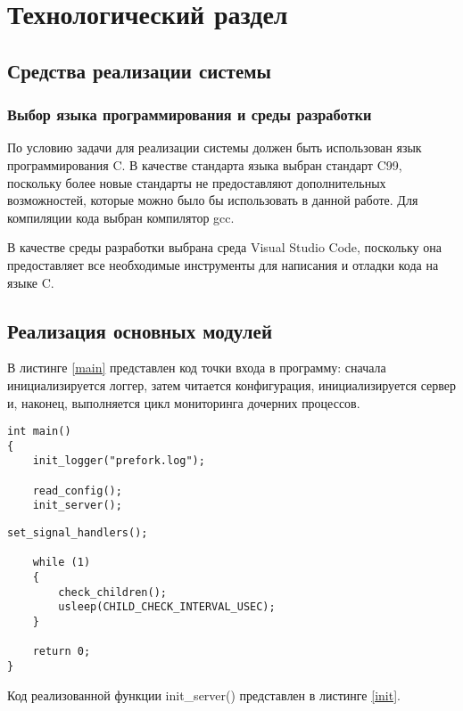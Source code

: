 \section{Технологический раздел}

\subsection{Средства реализации системы}

\subsubsection{Выбор языка программирования и среды разработки}

По условию задачи для реализации системы должен быть использован язык программирования C. В качестве стандарта языка выбран стандарт C99, поскольку более новые стандарты не предоставляют дополнительных возможностей, которые можно было бы использовать в данной работе. Для компиляции кода выбран компилятор gcc.

В качестве среды разработки выбрана среда Visual Studio Code, поскольку она предоставляет все необходимые инструменты для написания и отладки кода на языке C.

\subsection{Реализация основных модулей}

В листинге \ref{main} представлен код точки входа в программу: сначала инициализируется логгер, затем читается конфигурация, инициализируется сервер и, наконец, выполняется цикл мониторинга дочерних процессов.

\captionsetup{singlelinecheck = false, justification=raggedright}
\begin{lstlisting}[caption={Точка входа в программу}, label=main]
int main()
{
	init_logger("prefork.log");
	
	read_config();
	init_server();
\end{lstlisting}

\begin{lstlisting}[title={Окончание листинга \ref{main}}, label=main1, firstnumber=7]
	set_signal_handlers();

	while (1)
	{
		check_children();
		usleep(CHILD_CHECK_INTERVAL_USEC);
	}

	return 0;
}
\end{lstlisting}

Код реализованной функции init\_server() представлен в листинге \ref{init}.


